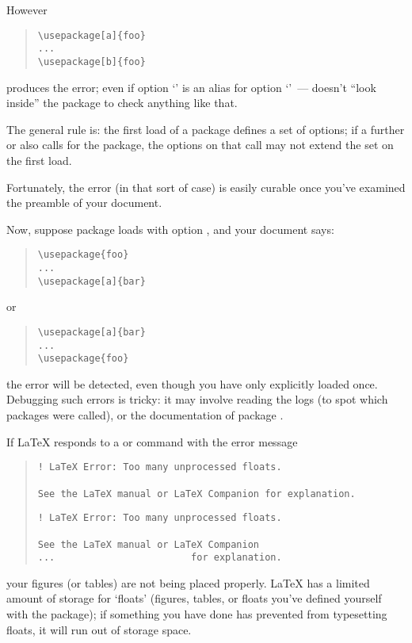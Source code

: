However
\begin{quote}
\begin{verbatim}
\usepackage[a]{foo}
...
\usepackage[b]{foo}
\end{verbatim}
\end{quote}
produces the error; even if option `' is an alias for
option `'~--- \latex{} doesn't ``look inside'' the package
to check anything like that.

The general rule is: the first load of a package defines a set of
options; if a further  or  also
calls for the package, the options on that call may not extend the set
on the first load.

Fortunately, the error (in that sort of case) is easily curable
once you've examined the preamble of your document.

Now, suppose package  loads  with option
, and your document says:
\begin{quote}
\begin{verbatim}
\usepackage{foo}
...
\usepackage[a]{bar}
\end{verbatim}
\end{quote}
or
\begin{quote}
\begin{verbatim}
\usepackage[a]{bar}
...
\usepackage{foo}
\end{verbatim}
\end{quote}
the error will be detected, even though you have only explicitly
loaded  once.  Debugging such errors is tricky: it may
involve reading the logs (to spot which packages were called), or the
documentation of package .


If \LaTeX{} responds to a  or
 command with the error message
\begin{quote}
\begin{wideversion}
\begin{verbatim}
! LaTeX Error: Too many unprocessed floats.

See the LaTeX manual or LaTeX Companion for explanation.
\end{verbatim}
\end{wideversion}
\begin{narrowversion}
\begin{verbatim}
! LaTeX Error: Too many unprocessed floats.

See the LaTeX manual or LaTeX Companion
...                        for explanation.
\end{verbatim}
\end{narrowversion}
\end{quote}
your figures (or tables) are not being placed properly.  \LaTeX{}
has a limited amount of storage for `floats' (figures, tables, or
floats you've defined yourself with the  package); if
something you have done has prevented \latex{} from typesetting
floats, it will run out of storage space.

